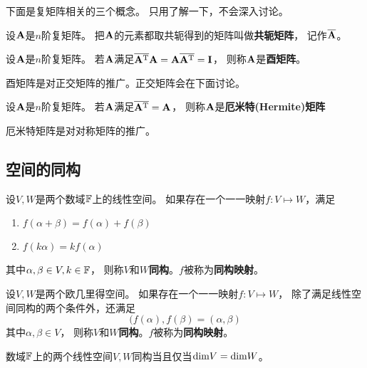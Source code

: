 下面是复矩阵相关的三个概念。
只用了解一下，不会深入讨论。

\begin{definition}[共轭矩阵]
  设$\mathbf{A}$是$n$阶复矩阵。
  把$\mathbf{A}$的元素都取共轭得到的矩阵叫做\textbf{共轭矩阵}，
  记作$\overline{\mathbf{A}}$。
\end{definition}

\begin{definition}[酉矩阵]
  设$\mathbf{A}$是$n$阶复矩阵。
  若$\mathbf{A}$满足$\overline{\mathbf{A}^{\textrm{T}}}\mathbf{A}=\mathbf{A}\overline{\mathbf{A}^{\textrm{T}}}=\mathbf{I}$，
  则称$\mathbf{A}$是\textbf{酉矩阵}。
\end{definition}

\begin{remark}
  酉矩阵是对正交矩阵的推广。正交矩阵会在下面讨论。
\end{remark}

\begin{definition}
  设$\mathbf{A}$是$n$阶复矩阵。
  若$\mathbf{A}$满足$\overline{\mathbf{A}^{\textrm{T}}}=\mathbf{A}$，
  则称$\mathbf{A}$是\textbf{厄米特(Hermite)矩阵}
\end{definition}

\begin{remark}
  厄米特矩阵是对对称矩阵的推广。
\end{remark}

\subsection{空间的同构}
\begin{definition}[线性空间的同构]
  设$V,W$是两个数域$\mathbb{F}$上的线性空间。
  如果存在一个一一映射$f:V\mapsto W$，满足
  \begin{enumerate}
    \item 
    $f(\alpha+\beta)=f(\alpha)+f(\beta)$
    \item
    $f(k\alpha)=kf(\alpha)$  
  \end{enumerate}
  其中$\alpha,\beta\in V,k\in\mathbb{F}$，
  则称$V$和$W$\textbf{同构}。$f$被称为\textbf{同构映射}。
\end{definition}

\begin{definition}[欧几里得空间的同构]
  设$V,W$是两个欧几里得空间。
  如果存在一个一一映射$f:V\mapsto W$，
  除了满足线性空间同构的两个条件外，还满足
  \[ (f(\alpha), f(\beta) = (\alpha, \beta) \]
  其中$\alpha,\beta\in V$，
  则称$V$和$W$\textbf{同构}。$f$被称为\textbf{同构映射}。
\end{definition}

\begin{theorem}[线性空间同构的充要条件]
  数域$\mathbb{F}$上的两个线性空间$V,W$同构当且仅当$\textrm{dim} V = \textrm{dim} W$。
\end{theorem}

